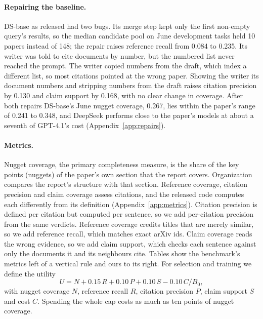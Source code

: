 \documentclass[11pt, letterpaper]{article}
\begin{document}
\paragraph{Repairing the baseline.} DS-base as released had two bugs. Its merge step kept only the
first non-empty query's results, so the median candidate pool on June development tasks held 10
papers instead of 148; the repair raises reference recall from 0.084 to 0.235. Its writer was told
to cite documents by number, but the numbered list never reached the prompt. The writer copied
numbers from the draft, which index a different list, so most citations pointed at the wrong paper.
Showing the writer its document numbers and stripping numbers from the draft raises citation
precision by 0.130 and claim support by 0.168, with no clear change in coverage. After both repairs DS-base's June nugget coverage, 0.267,
lies within the paper's range of 0.241 to 0.348, and DeepSeek performs close to the paper's models at
about a seventh of GPT-4.1's cost (Appendix~\ref{app:repairs}).

\paragraph{Metrics.} Nugget coverage, the primary completeness measure, is the share of the key
points (nuggets) of the paper's own section that the report covers. Organization compares the
report's structure with that section. Reference coverage, citation precision and claim
coverage assess citations, and the released code computes each differently from its definition
(Appendix~\ref{app:metrics}). Citation precision is defined per citation but computed per sentence,
so we add per-citation precision from the same verdicts. Reference coverage credits titles that are
merely similar, so we add reference recall, which matches exact arXiv ids. Claim coverage reads the
wrong evidence, so we add claim support, which checks each sentence against only the documents it
and its neighbours cite. Tables show the benchmark's metrics left of a vertical rule and ours to its
right. For selection and training we define the utility
\[
U = N + 0.15\,R + 0.10\,P + 0.10\,S - 0.10\,C/B_0,
\]
with nugget coverage $N$, reference recall $R$, citation precision $P$, claim support $S$ and cost
$C$. Spending the whole cap costs as much as ten points of nugget coverage.
\end{document}
